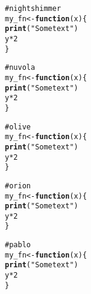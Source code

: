 \documentclass[12pt]{article}\usepackage{graphicx, color}
\makeatletter
\newcommand{\hlfunctioncall}[1]{\textcolor[rgb]{0.188235294117647,0.650980392156863,0.188235294117647}{\textbf{#1}}}%
\newcommand{\hlstring}[1]{\textcolor[rgb]{0.850980392156863,1,0.466666666666667}{#1}}%
\newcommand{\hlcomment}[1]{\textcolor[rgb]{0.533333333333333,0.533333333333333,0.533333333333333}{#1}}%
\newenvironment{kframe}{%
 \def\at@end@of@kframe{}%
 \ifinner\ifhmode%
  \def\at@end@of@kframe{\end{minipage}}%
  \begin{minipage}{\columnwidth}%
 \fi\fi%
 \def\FrameCommand##1{\hskip\@totalleftmargin \hskip-\fboxsep
 \colorbox{shadecolor}{##1}\hskip-\fboxsep
     \hskip-\linewidth \hskip-\@totalleftmargin \hskip\columnwidth}%
 \MakeFramed {\advance\hsize-\width
   \@totalleftmargin\z@ \linewidth\hsize
   \@setminipage}}%
 {\par\unskip\endMakeFramed%
 \at@end@of@kframe}
\newenvironment{knitrout}{}{} %
\makeatother
\begin{document}
\begin{knitrout}
\color{fgcolor}\begin{kframe}
\begin{alltt}
\hlcomment{# nightshimmer}
my_fn <- \hlfunctioncall{function}(x) \{
    \hlfunctioncall{print}(\hlstring{"Some text"})
    y * 2
\}
\end{alltt}
\end{kframe}
\end{knitrout}





\begin{knitrout}
\color{fgcolor}\begin{kframe}
\begin{alltt}
\hlcomment{# nuvola}
my_fn <- \hlfunctioncall{function}(x) \{
    \hlfunctioncall{print}(\hlstring{"Some text"})
    y * 2
\}
\end{alltt}
\end{kframe}
\end{knitrout}





\begin{knitrout}
\color{fgcolor}\begin{kframe}
\begin{alltt}
\hlcomment{# olive}
my_fn <- \hlfunctioncall{function}(x) \{
    \hlfunctioncall{print}(\hlstring{"Some text"})
    y * 2
\}
\end{alltt}
\end{kframe}
\end{knitrout}





\begin{knitrout}
\color{fgcolor}\begin{kframe}
\begin{alltt}
\hlcomment{# orion}
my_fn <- \hlfunctioncall{function}(x) \{
    \hlfunctioncall{print}(\hlstring{"Some text"})
    y * 2
\}
\end{alltt}
\end{kframe}
\end{knitrout}





\begin{knitrout}
\color{fgcolor}\begin{kframe}
\begin{alltt}
\hlcomment{# pablo}
my_fn <- \hlfunctioncall{function}(x) \{
    \hlfunctioncall{print}(\hlstring{"Some text"})
    y * 2
\}
\end{alltt}
\end{kframe}
\end{knitrout}
\end{document}
